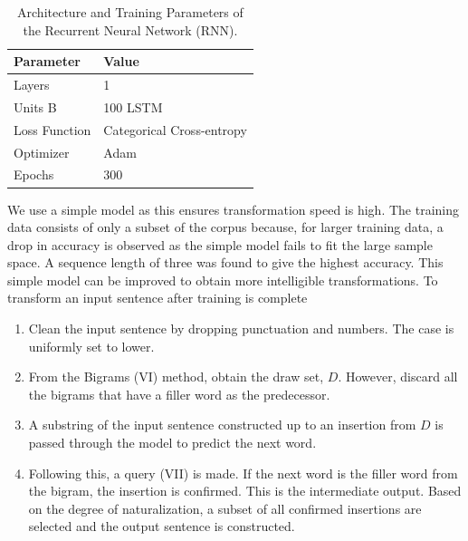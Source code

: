 \documentclass[journal]{IEEEtran}
\begin{document}
\begin{table}
\caption{Architecture and Training Parameters of the Recurrent Neural Network (RNN).}
\label{tab4}
\small
\setlength{\tabcolsep}{3pt}
\begin{tabular}{|p{116pt}|p{116pt}|}
\hline
Parameter& 
Value \\
\hline
Layers &  1 \\
Units B & 100 LSTM\cite{lstm} \\
Loss Function &  Categorical Cross-entropy\cite{cce} \\
Optimizer &  Adam\cite{adam} \\
Epochs & 300 \\
\hline
\end{tabular}
\label{tab4}
\end{table}

We use a simple model as this ensures transformation speed is high. The training data consists of only a subset of the corpus because, for larger training data, a drop in accuracy is observed as the simple model fails to fit the large sample space. A sequence length of three was found to give the highest accuracy. This simple model can be improved to obtain more intelligible transformations.
To transform an input sentence after training is complete

\begin{enumerate}
    \item Clean the input sentence by dropping punctuation and numbers. The case is uniformly set to lower.
    \item From the Bigrams (VI) method, obtain the draw set, $D$. However, discard all the bigrams that have a filler word as the predecessor.
    \item A substring of the input sentence constructed up to an insertion from $D$ is passed through the model to predict the next word. 
    \item Following this, a query (VII) is made. If the next word is the filler word from the bigram, the insertion is confirmed. This is the intermediate output. Based on the degree of naturalization, a subset of all confirmed insertions are selected and the output sentence is constructed.
\end{enumerate}
\end{document}
